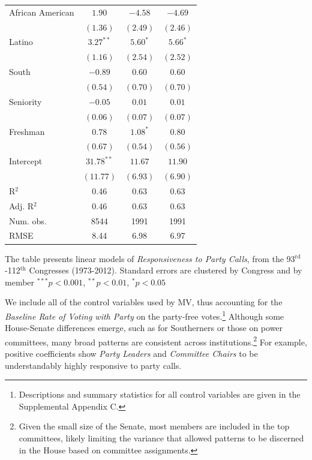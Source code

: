 \documentclass[12pt]{article}
\begin{document}
\begin{table}[!htbp]
\begin{threeparttable}
\begin{tabular}{l c c c }
African American      & $1.90$       & $-4.58$      & $-4.69$       \\
                      & $(1.36)$     & $(2.49)$     & $(2.46)$      \\
Latino                & $3.27^{**}$  & $5.60^{*}$   & $5.66^{*}$    \\
                      & $(1.16)$     & $(2.54)$     & $(2.52)$      \\
South                 & $-0.89$      & $0.60$       & $0.60$        \\
                      & $(0.54)$     & $(0.70)$     & $(0.70)$      \\
Seniority             & $-0.05$      & $0.01$       & $0.01$        \\
                      & $(0.06)$     & $(0.07)$     & $(0.07)$      \\
Freshman              & $0.78$       & $1.08^{*}$   & $0.80$        \\
                      & $(0.67)$     & $(0.54)$     & $(0.56)$      \\
Intercept             & $31.78^{**}$ & $11.67$      & $11.90$       \\
                      & $(11.77)$    & $(6.93)$     & $(6.90)$      \\
\hline
R$^2$                 & 0.46         & 0.63         & 0.63          \\
Adj. R$^2$            & 0.46         & 0.63         & 0.63          \\
Num. obs.             & 8544         & 1991         & 1991          \\
RMSE                  & 8.44         & 6.98         & 6.97          \\
\hline

\end{tabular}
\begin{tablenotes}
   \item
   The table presents linear models of \textit{Responsiveness to Party Calls},
   from the 93$^{\text{rd}}$-112$^{\text{th}}$ Congresses (1973-2012).
  Standard errors are clustered by Congress and by member
   $^{***}p<0.001$, $^{**}p<0.01$, $^*p<0.05$
 \end{tablenotes}
\end{threeparttable}
\end{table}

We include all of the control variables used by MV, thus accounting for the \textit{Baseline Rate of Voting with Party} on the party-free votes.\footnote{\doublespacing\normalsize Descriptions and summary statistics for all control variables are given in the Supplemental Appendix C.} Although some House-Senate differences emerge, such as for Southerners or those on power committees, many broad patterns are consistent across institutions.\footnote{\doublespacing\normalsize Given the small size of the Senate, most members are included in the top committees, likely limiting the variance that allowed patterns to be discerned in the House based on committee assignments.} For example, positive coefficients show \textit{Party Leaders} and \textit{Committee Chairs} to be understandably highly responsive to party calls.
\end{document}
